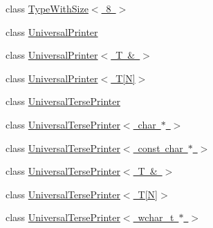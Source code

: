 \begin{DoxyCompactItemize}
class \mbox{\hyperlink{classtesting_1_1internal_1_1_type_with_size_3_018_01_4}{Type\+With\+Size$<$ 8 $>$}}
\item 
class \mbox{\hyperlink{classtesting_1_1internal_1_1_universal_printer}{Universal\+Printer}}
\item 
class \mbox{\hyperlink{classtesting_1_1internal_1_1_universal_printer_3_01_t_01_6_01_4}{Universal\+Printer$<$ T \& $>$}}
\item 
class \mbox{\hyperlink{classtesting_1_1internal_1_1_universal_printer_3_01_t[_n]_4}{Universal\+Printer$<$ T\mbox{[}\+N\mbox{]}$>$}}
\item 
class \mbox{\hyperlink{classtesting_1_1internal_1_1_universal_terse_printer}{Universal\+Terse\+Printer}}
\item 
class \mbox{\hyperlink{classtesting_1_1internal_1_1_universal_terse_printer_3_01char_01_5_01_4}{Universal\+Terse\+Printer$<$ char $\ast$ $>$}}
\item 
class \mbox{\hyperlink{classtesting_1_1internal_1_1_universal_terse_printer_3_01const_01char_01_5_01_4}{Universal\+Terse\+Printer$<$ const char $\ast$ $>$}}
\item 
class \mbox{\hyperlink{classtesting_1_1internal_1_1_universal_terse_printer_3_01_t_01_6_01_4}{Universal\+Terse\+Printer$<$ T \& $>$}}
\item 
class \mbox{\hyperlink{classtesting_1_1internal_1_1_universal_terse_printer_3_01_t[_n]_4}{Universal\+Terse\+Printer$<$ T\mbox{[}\+N\mbox{]}$>$}}
\item 
class \mbox{\hyperlink{classtesting_1_1internal_1_1_universal_terse_printer_3_01wchar__t_01_5_01_4}{Universal\+Terse\+Printer$<$ wchar\+\_\+t $\ast$ $>$}}
\end{DoxyCompactItemize}
